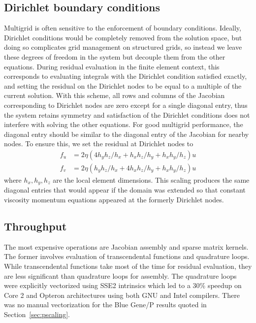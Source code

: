 \documentclass[3p]{elsarticle}
\begin{document}
\subsection{Dirichlet boundary conditions}\label{ssec:dirichlet}
Multigrid is often sensitive to the enforcement of boundary conditions.  Ideally, Dirichlet
conditions would be completely removed from the solution space, but doing so complicates grid
management on structured grids, so instead we leave these degrees of freedom in the system but
decouple them from the other equations.  During residual evaluation in the finite element context,
this corresponds to evaluating integrals with the Dirichlet condition satisfied exactly, and setting
the residual on the Dirichlet nodes to be equal to a multiple of the current solution.  With this
scheme, all rows and columns of the Jacobian corresponding to Dirichlet nodes are zero except for a
single diagonal entry, thus the system retains symmetry and satisfaction of the Dirichlet conditions
does not interfere with solving the other equations.  For good multigrid performance, the diagonal
entry should be similar to the diagonal entry of the Jacobian for nearby nodes.  To ensure this, we
set the residual at Dirichlet nodes to
\begin{align}\label{eq:dirichlet-scale}
  f_u &= 2 \eta (4 h_yh_z/h_x + h_x h_z/h_y + h_x h_y/h_z) u \\
  f_v &= 2 \eta (h_yh_z/h_x + 4 h_x h_z/h_y + h_x h_y/h_z) u
\end{align}
where $h_x,h_y,h_z$ are the local element dimensions.  This scaling produces the same diagonal
entries that would appear if the domain was extended so that constant viscosity momentum equations
appeared at the formerly Dirichlet nodes.

\subsection{Throughput}
The most expensive operations are Jacobian assembly and sparse matrix kernels.  The former involves evaluation of transcendental functions and quadrature loops.  While transcendental functions take most of the time for residual evaluation, they are less significant than quadrature loops for assembly.  The quadrature loops were explicitly vectorized using SSE2 intrinsics which led to a 30\% speedup on Core 2 and Opteron architectures using both GNU and Intel compilers.  There was no manual vectorization for the Blue Gene/P results quoted in Section~\ref{sec:pscaling}.
\end{document}
